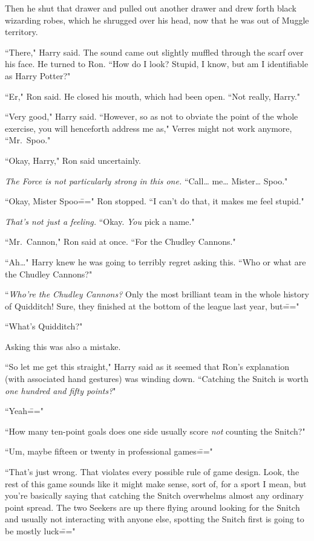 Then he shut that drawer and pulled out another drawer and drew forth black wizarding robes, which he shrugged over his head, now that he was out of Muggle territory.

``There," Harry said. The sound came out slightly muffled through the scarf over his face. He turned to Ron. ``How do I look? Stupid, I know, but am I identifiable as Harry Potter?"

``Er," Ron said. He closed his mouth, which had been open. ``Not really, Harry."

``Very good," Harry said. ``However, so as not to obviate the point of the whole exercise, you will henceforth address me as," Verres might not work anymore, ``Mr.~Spoo."

``Okay, Harry," Ron said uncertainly.

\emph{The Force is not particularly strong in this one.} ``Call{\ldots} me{\ldots} Mister{\ldots} Spoo."

``Okay, Mister Spoo\===" Ron stopped. ``I can't do that, it makes me feel stupid."

\emph{That's not just a feeling.} ``Okay. \emph{You} pick a name."

``Mr.~Cannon," Ron said at once. ``For the Chudley Cannons."

``Ah{\ldots}" Harry knew he was going to terribly regret asking this. ``Who or what are the Chudley Cannons?"

``\emph{Who're the Chudley Cannons?} Only the most brilliant team in the whole history of Quidditch! Sure, they finished at the bottom of the league last year, but\==="

``What's Quidditch?"

Asking this was also a mistake.

``So let me get this straight," Harry said as it seemed that Ron's explanation (with associated hand gestures) was winding down. ``Catching the Snitch is worth \emph{one hundred and fifty points?}"

``Yeah\==="

``How many ten-point goals does one side usually score \emph{not} counting the Snitch?"

``Um, maybe fifteen or twenty in professional games\==="

``That's just wrong. That violates every possible rule of game design. Look, the rest of this game sounds like it might make sense, sort of, for a sport I mean, but you're basically saying that catching the Snitch overwhelms almost any ordinary point spread. The two Seekers are up there flying around looking for the Snitch and usually not interacting with anyone else, spotting the Snitch first is going to be mostly luck\==="

